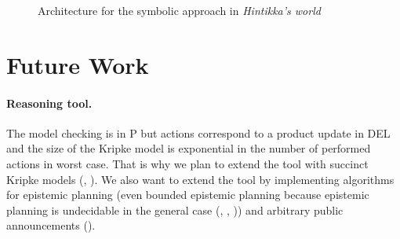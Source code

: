 \documentclass{article}
\begin{document}
\begin{figure}
	\begin{center}
	\end{center}
	\caption{Architecture for the symbolic approach in \emph{Hintikka's world}\label{figure:architecture}}
\end{figure}

\section{Future Work}
\label{section:perspectives}

\paragraph{Reasoning tool. }
The model checking is in P but actions correspond to a product update in DEL  \cite{baltag1998logic} and the size of the Kripke model is exponential in the number of performed actions in worst case. That is why we plan to extend the tool with succinct Kripke models (\cite{DBLP:conf/lori/BenthemEGS15}, \cite{DBLP:conf/atal/CharrierS15}). We also want to extend the tool by implementing algorithms for epistemic planning (even bounded epistemic planning because epistemic planning is undecidable in the general case (\cite{DBLP:journals/jancl/BolanderA11}, \cite{DBLP:conf/ijcai/AucherB13}, \cite{ijcai2018SmallUndecidableEpistemicPlanning})) and arbitrary public announcements (\cite{DBLP:conf/atal/CharrierS15}).
\end{document}
